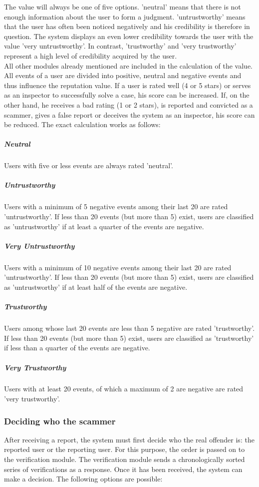 \documentclass[
a4paper,     %
titlepage,   %
14pt         %
]{scrartcl}  %
\theoremstyle{mystyle}
\begin{document}
The value will always be one of five options. 'neutral' means that there is not enough information about the user to form a judgment. 'untrustworthy' means that the user has often been noticed negatively and his credibility is therefore in question. The system displays an even lower credibility towards the user with the value 'very untrustworthy'. In contrast, 'trustworthy' and 'very trustworthy' represent a high level of credibility acquired by the user. \\

All other modules already mentioned are included in the calculation of the value. All events of a user are divided into positive, neutral and negative events and thus influence the reputation value. If a user is rated well (4 or 5 stars) or serves as an inspector to successfully solve a case, his score can be increased. If, on the other hand, he receives a bad rating (1 or 2 stars), is reported and convicted as a scammer, gives a false report or deceives the system as an inspector, his score can be reduced. The exact calculation works as follows: \\

\subparagraph{Neutral} Users with five or less events are always rated 'neutral'.
\subparagraph{Untrustworthy} Users with a minimum of 5 negative events among their last 20 are rated 'untrustworthy'. If less than 20 events (but more than 5) exist, users are classified as 'untrustworthy' if at least a quarter of the events are negative.
\subparagraph{Very Untrustworthy} Users with a minimum of 10 negative events among their last 20 are rated 'untrustworthy'. If less than 20 events (but more than 5) exist, users are classified as 'untrustworthy' if at least half of the events are negative.
\subparagraph{Trustworthy} Users among whose last 20 events are less than 5 negative are rated 'trustworthy'. If less than 20 events (but more than 5) exist, users are classified as 'trustworthy' if less than a quarter of the events are negative.
\subparagraph{Very Trustworthy} Users with at least 20 events, of which a maximum of 2 are negative are rated 'very trustworthy'.

\subsubsection{Deciding who the scammer} After receiving a report, the system must first decide who the real offender is: the reported user or the reporting user. For this purpose, the order is passed on to the verification module. The verification module sends a chronologically sorted series of verifications as a response. Once it has been received, the system can make a decision. The following options are possible:
\end{document}
